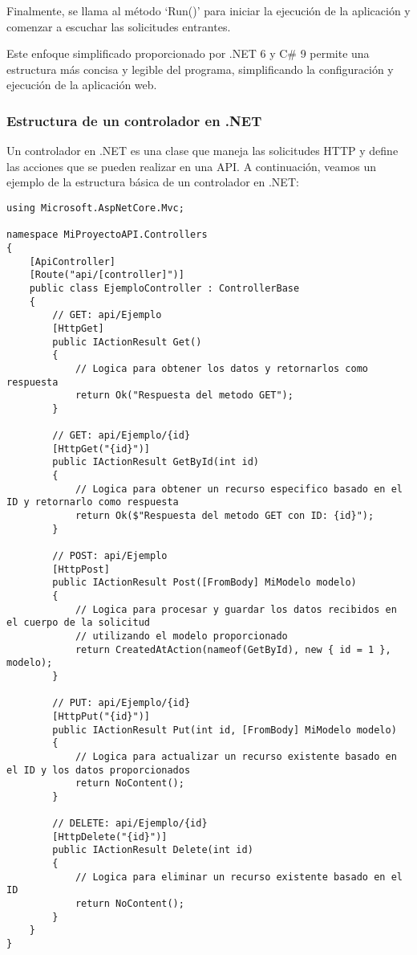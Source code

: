 \documentclass[executivepaper]{article}
\begin{document}
Finalmente, se llama al método \enquote*{Run()} para iniciar la ejecución de la aplicación y comenzar a escuchar las solicitudes entrantes.

Este enfoque simplificado proporcionado por .NET 6 y C\# 9 permite una estructura más concisa y legible del programa, simplificando la configuración y ejecución de la aplicación web.

\subsubsection{Estructura de un controlador en .NET}

Un controlador en .NET es una clase que maneja las solicitudes HTTP y define las acciones que se pueden realizar en una API. A continuación, veamos un ejemplo de la estructura básica de un controlador en .NET:

\begin{lstlisting}
using Microsoft.AspNetCore.Mvc;

namespace MiProyectoAPI.Controllers
{
    [ApiController]
    [Route("api/[controller]")]
    public class EjemploController : ControllerBase
    {
        // GET: api/Ejemplo
        [HttpGet]
        public IActionResult Get()
        {
            // Logica para obtener los datos y retornarlos como respuesta
            return Ok("Respuesta del metodo GET");
        }

        // GET: api/Ejemplo/{id}
        [HttpGet("{id}")]
        public IActionResult GetById(int id)
        {
            // Logica para obtener un recurso especifico basado en el ID y retornarlo como respuesta
            return Ok($"Respuesta del metodo GET con ID: {id}");
        }

        // POST: api/Ejemplo
        [HttpPost]
        public IActionResult Post([FromBody] MiModelo modelo)
        {
            // Logica para procesar y guardar los datos recibidos en el cuerpo de la solicitud
            // utilizando el modelo proporcionado
            return CreatedAtAction(nameof(GetById), new { id = 1 }, modelo);
        }

        // PUT: api/Ejemplo/{id}
        [HttpPut("{id}")]
        public IActionResult Put(int id, [FromBody] MiModelo modelo)
        {
            // Logica para actualizar un recurso existente basado en el ID y los datos proporcionados
            return NoContent();
        }

        // DELETE: api/Ejemplo/{id}
        [HttpDelete("{id}")]
        public IActionResult Delete(int id)
        {
            // Logica para eliminar un recurso existente basado en el ID
            return NoContent();
        }
    }
}
\end{lstlisting}
\end{document}
